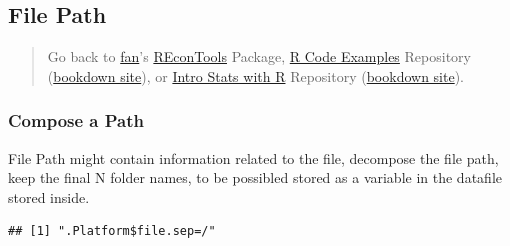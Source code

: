 \documentclass[
]{book}
\newenvironment{Shaded}{\begin{snugshade}}{\end{snugshade}}
\newcommand{\AttributeTok}[1]{\textcolor[rgb]{0.77,0.63,0.00}{#1}}
\newcommand{\CommentTok}[1]{\textcolor[rgb]{0.56,0.35,0.01}{\textit{#1}}}
\newcommand{\FunctionTok}[1]{\textcolor[rgb]{0.00,0.00,0.00}{#1}}
\newcommand{\NormalTok}[1]{#1}
\newcommand{\OtherTok}[1]{\textcolor[rgb]{0.56,0.35,0.01}{#1}}
\newcommand{\SpecialCharTok}[1]{\textcolor[rgb]{0.00,0.00,0.00}{#1}}
\newcommand{\StringTok}[1]{\textcolor[rgb]{0.31,0.60,0.02}{#1}}
\begin{document}
\hypertarget{file-path}{%
\subsection{File Path}\label{file-path}}

\begin{quote}
Go back to \href{http://fanwangecon.github.io/}{fan}'s \href{https://fanwangecon.github.io/REconTools/}{REconTools} Package, \href{https://fanwangecon.github.io/R4Econ/}{R Code Examples} Repository (\href{https://fanwangecon.github.io/R4Econ/bookdown}{bookdown site}), or \href{https://fanwangecon.github.io/Stat4Econ/}{Intro Stats with R} Repository (\href{https://fanwangecon.github.io/Stat4Econ/bookdown}{bookdown site}).
\end{quote}

\hypertarget{compose-a-path}{%
\subsubsection{Compose a Path}\label{compose-a-path}}

File Path might contain information related to the file, decompose the file path, keep the final N folder names, to be possibled stored as a variable in the datafile stored inside.

\begin{Shaded}
\end{Shaded}

\begin{verbatim}
## [1] ".Platform$file.sep=/"
\end{verbatim}

\begin{Shaded}
\end{Shaded}
\end{document}
